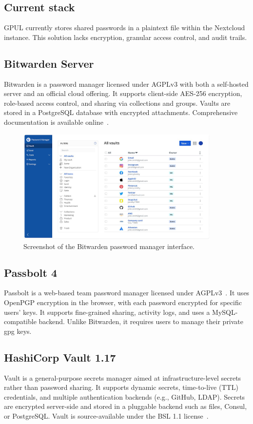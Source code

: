 \subsection*{Current stack}
GPUL currently stores shared passwords in a plaintext file within the Nextcloud instance. This solution lacks encryption, granular access control, and audit trails.

\subsection*{Bitwarden Server}
Bitwarden is a password manager licensed under AGPLv3 with both a self-hosted server and an official cloud offering. It supports client-side AES-256 encryption, role-based access control, and sharing via collections and groups. Vaults are stored in a PostgreSQL database with encrypted attachments. Comprehensive documentation is available online~\cite{bitwarden-docs}.

\begin{figure}[h!]
  \centering
  \includegraphics[width=0.9\textwidth]{imaxes/bitwarden-ui.png}
  \caption{Screenshot of the Bitwarden password manager interface.}
  \label{fig:bitwarden-ui}
\end{figure}

\subsection*{Passbolt 4}
Passbolt is a web-based team password manager licensed under AGPLv3~\cite{passbolt-security}. It uses OpenPGP encryption in the browser, with each password encrypted for specific users' keys. It supports fine-grained sharing, activity logs, and uses a MySQL-compatible backend. Unlike Bitwarden, it requires users to manage their private \gls{gpg} keys.

\subsection*{HashiCorp Vault 1.17}
Vault is a general-purpose secrets manager aimed at infrastructure-level secrets rather than password sharing. It supports dynamic secrets, time-to-live (TTL) credentials, and multiple authentication backends (e.g., GitHub, LDAP). Secrets are encrypted server-side and stored in a pluggable backend such as files, Consul, or PostgreSQL. Vault is source-available under the BSL 1.1 license~\cite{vault-bsl}.

